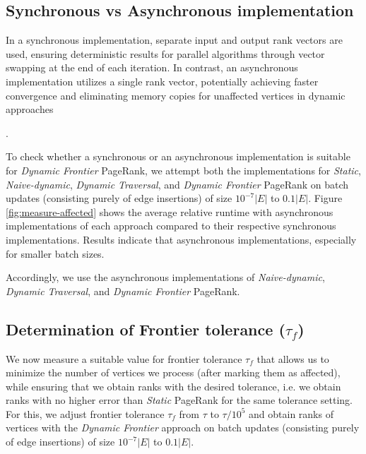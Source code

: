 \subsection{Synchronous vs Asynchronous implementation}

In a synchronous implementation, separate input and output rank vectors are used, ensuring deterministic results for parallel algorithms through vector swapping at the end of each iteration. In contrast, an asynchronous implementation utilizes a single rank vector, potentially achieving faster convergence and eliminating memory copies for unaffected vertices in dynamic approaches.

To check whether a synchronous or an asynchronous implementation is suitable for \textit{Dynamic Frontier} PageRank, we attempt both the implementations for \textit{Static}, \textit{Naive-dynamic}, \textit{Dynamic Traversal}, and \textit{Dynamic Frontier} PageRank on batch updates (consisting purely of edge insertions) of size $10^{-7}|E|$ to $0.1|E|$. Figure \ref{fig:measure-affected} shows the average relative runtime with asynchronous implementations of each approach compared to their respective synchronous implementations. Results indicate that asynchronous implementations, especially for smaller batch sizes. Accordingly, we use the asynchronous implementations of \textit{Naive-dynamic}, \textit{Dynamic Traversal}, and \textit{Dynamic Frontier} PageRank.




\subsection{Determination of Frontier tolerance ($\tau_f$)}

We now measure a suitable value for frontier tolerance $\tau_f$ that allows us to minimize the number of vertices we process (after marking them as affected), while ensuring that we obtain ranks with the desired tolerance, i.e. we obtain ranks with no higher error than \textit{Static} PageRank for the same tolerance setting. For this, we adjust frontier tolerance $\tau_f$ from $\tau$ to $\tau / 10^5$ and obtain ranks of vertices with the \textit{Dynamic Frontier} approach on batch updates (consisting purely of edge insertions) of size $10^{-7}|E|$ to $0.1|E|$.

